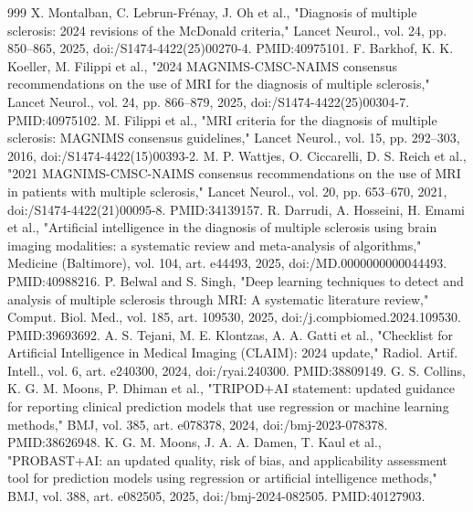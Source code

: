 \documentclass[journal,twoside,web]{ieeecolor}
\begin{document}
\FloatBarrier
\clearpage
\begin{thebibliography}{999}
 X. Montalban, C. Lebrun-Frénay, J. Oh et al., "Diagnosis of multiple sclerosis: 2024 revisions of the McDonald criteria," Lancet Neurol., vol. 24, pp. 850--865, 2025, doi:/\allowbreak S1474-4422(25)00270-4. PMID:40975101.
 F. Barkhof, K. K. Koeller, M. Filippi et al., "2024 MAGNIMS-CMSC-NAIMS consensus recommendations on the use of MRI for the diagnosis of multiple sclerosis," Lancet Neurol., vol. 24, pp. 866--879, 2025, doi:/\allowbreak S1474-4422(25)00304-7. PMID:40975102.
 M. Filippi et al., "MRI criteria for the diagnosis of multiple sclerosis: MAGNIMS consensus guidelines," Lancet Neurol., vol. 15, pp. 292--303, 2016, doi:/\allowbreak S1474-4422(15)00393-2.
 M. P. Wattjes, O. Ciccarelli, D. S. Reich et al., "2021 MAGNIMS-CMSC-NAIMS consensus recommendations on the use of MRI in patients with multiple sclerosis," Lancet Neurol., vol. 20, pp. 653--670, 2021, doi:/\allowbreak S1474-4422(21)00095-8. PMID:34139157.
 R. Darrudi, A. Hosseini, H. Emami et al., "Artificial intelligence in the diagnosis of multiple sclerosis using brain imaging modalities: a systematic review and meta-analysis of algorithms," Medicine (Baltimore), vol. 104, art. e44493, 2025, doi:/\allowbreak MD.0000000000044493. PMID:40988216.
 P. Belwal and S. Singh, "Deep learning techniques to detect and analysis of multiple sclerosis through MRI: A systematic literature review," Comput. Biol. Med., vol. 185, art. 109530, 2025, doi:/\allowbreak j.compbiomed.2024.109530. PMID:39693692.
 A. S. Tejani, M. E. Klontzas, A. A. Gatti et al., "Checklist for Artificial Intelligence in Medical Imaging (CLAIM): 2024 update," Radiol. Artif. Intell., vol. 6, art. e240300, 2024, doi:/\allowbreak ryai.240300. PMID:38809149.
 G. S. Collins, K. G. M. Moons, P. Dhiman et al., "TRIPOD+AI statement: updated guidance for reporting clinical prediction models that use regression or machine learning methods," BMJ, vol. 385, art. e078378, 2024, doi:/\allowbreak bmj-2023-078378. PMID:38626948.
 K. G. M. Moons, J. A. A. Damen, T. Kaul et al., "PROBAST+AI: an updated quality, risk of bias, and applicability assessment tool for prediction models using regression or artificial intelligence methods," BMJ, vol. 388, art. e082505, 2025, doi:/\allowbreak bmj-2024-082505. PMID:40127903.

\end{thebibliography}
\end{document}
